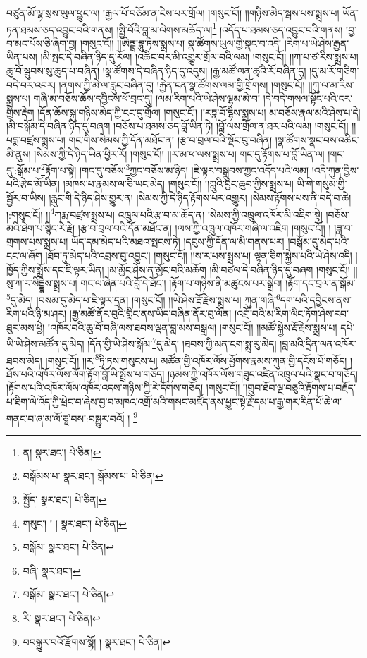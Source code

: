 བཙུན་མོ་ལྷ་སྲས་ཡུལ་ཕྱུང་ལ། །རྒྱལ་པོ་བཅོམ་ན་ངེས་པར་གྲོལ། །གསུང་ངོ།། །།གཉིས་མེད་སྦས་པས་སྨྲས་པ། ཡོན་ཏན་ཐམས་ཅད་འབྱུང་བའི་གནས། །སྤྱི་བོའི་བླ་མ་ལེགས་མཆོད་ལ།\footnote{ན།  སྣར་ཐང་།  པེ་ཅིན། } །འདོད་པ་ཐམས་ཅད་འབྱུང་བའི་གནས། །བྱ་བ་མང་པོས་ཅི་ཞིག་བྱ། །གསུང་ངོ།། །།ཨིནྡྲ་བྷཱུ་ཏིས་སྨྲས་པ། སྣ་ཚོགས་ཡུལ་གྱི་སྣང་བ་འདི། །རིག་པ་ཡེ་ཤེས་རྒྱན་ཡིན་པས། །མི་སྤང་དེ་བཞིན་ཉིད་དུ་རོལ། །འཆིང་བར་མི་འགྱུར་གྲོལ་བའི་ལམ། །གསུང་ངོ།། །།ཀ་པ་ཙ་རིས་སྨྲས་པ། ཆུ་བོ་སྦུབས་སུ་ཆུད་པ་བཞིན། །སྣ་ཚོགས་དེ་བཞིན་ཉིད་དུ་འདུས། །རྒྱ་མཚོ་ལན་ཚྭའི་རོ་བཞིན་དུ། །དུ་མ་རོ་གཅིག་བདེ་བར་འབར། །ནགས་ཀྱི་མེ་ལ་རླུང་བཞིན་དུ། །རྐྱེན་ངན་སྣ་ཚོགས་ལམ་གྱི་གྲོགས། །གསུང་ངོ།། །།ཀུ་ལ་མ་རིས་སྨྲས་པ། གཞི་མ་བཅོས་ཆོས་དབྱིངས་ཕོ་བྲང་དུ། །ལམ་རིག་པའི་ཡེ་ཤེས་ལྷམ་མེ་བ། །དེ་བདེ་གསལ་སྟོང་པའི་ངར་གྱིས་རྡེག །དོན་ཆོས་སྐུ་གཉིས་མེད་ཀྱི་ངང་དུ་གྲོལ། །གསུང་ངོ།། །།རཏྣ་བོ་དྷིས་སྨྲས་པ། མ་བཅོས་རྣལ་མའི་ཤེས་པ་དེ། །མི་བསྒོམ་དེ་བཞིན་ཉིད་དུ་བཞག །བཅོས་པ་ཐམས་ཅད་བློ་ཡིན་ཏེ། །བློ་ལས་གྲོལ་ན་ཐར་པའི་ལམ། །གསུང་ངོ།། །།པདྨ་བཛྲས་སྨྲས་པ། གང་གིས་སེམས་ཀྱི་དོན་མཐོང་ན། །རྩ་བ་བྲལ་བའི་སྡོང་བུ་བཞིན། །སྣ་ཚོགས་སྣང་བས་འཆིང་མི་ནུས། །སེམས་ཀྱི་དེ་ཉིད་ཡིན་ཕྱིར་རོ། །གསུང་ངོ།། །།ར་མ་ཕ་ལས་སྨྲས་པ། གང་དུ་རྟོགས་པ་བློ་ཡིན་ལ། །གང་དུ་:སྒོམ་པ་\footnote{བསྒོམས་པ་  སྣར་ཐང་། སྒོམས་པ་  པེ་ཅིན། }རྟོག་པ་སྟེ། །གང་དུ་བཅོས་\footnote{སྤྱོད་  སྣར་ཐང་།  པེ་ཅིན། }ཀྱང་བཅོས་མ་ཉིད། །ཇི་ལྟར་བསྒྲུབས་ཀྱང་འདོད་པའི་ལམ། །འདི་ཀུན་བྱིས་པའི་རྩེད་མོ་ཡིན། །མཁས་པ་རྣམས་ལ་ཅི་ཡང་མེད། །གསུང་ངོ།། །།ཀླུའི་བྱང་ཆུབ་ཀྱིས་སྨྲས་པ། ཡི་གེ་གསུམ་གྱི་སྦྱོར་བ་ཡིས། །རླུང་གི་དེ་ཉིད་ཤེས་གྱུར་ན། །སེམས་ཀྱི་དེ་ཉིད་རྟོགས་པར་འགྱུར། །སེམས་རྟོགས་པས་ནི་བདེ་བ་ཆེ། །:གསུང་ངོ།། །།\footnote{གསུང་། ། །  སྣར་ཐང་།  པེ་ཅིན། }ཀརྨ་བཛྲས་སྨྲས་པ། འཁྲུལ་པའི་རྩ་བ་མ་ཆོད་ན། །སེམས་ཀྱི་འཁྲུལ་འཁོར་མི་འཇིག་སྟེ། །བཅོས་མའི་ཐེག་པ་སྙིང་རེ་རྗེ། །རྩ་བ་བྲལ་བའི་དོན་མཐོང་ན། །ལས་ཀྱི་འཁྲུལ་འཁོར་གཞི་ལ་འཇིག །གསུང་ངོ།། །
།ཟླ་བ་གྲགས་པས་སྨྲས་པ། ཡོད་དམ་མེད་པའི་མཐའ་སྤངས་ཏེ། །དབུས་ཀྱི་དོན་ལ་མི་གནས་པར། །བསྒོམ་དུ་མེད་པའི་ངང་ལ་ཞོག །ཐོབ་ཏུ་མེད་པའི་འབྲས་བུ་འབྱུང་། །གསུང་ངོ།། །།ས་ར་པས་སྨྲས་པ། ལྷན་ཅིག་སྐྱེས་པའི་ཡེ་ཤེས་འདི། །ཁྱོད་ཀྱིས་སྨྲོས་དང་ཇི་ལྟར་ཡིན། །མ་མྱོང་ཤེས་ན་མྱོང་བའི་མཆོག །མི་བཙལ་དེ་བཞིན་ཉིད་དུ་བཞག །གསུང་ངོ།། །།སུ་ཀ་ར་སིདྡྷིས་སྨྲས་པ། གང་ལ་ཞེན་པའི་བློ་དེ་ཐོང་། །རྟོག་པ་གཉིས་ནི་མཚུངས་པར་སྒྲིབ། །རྟོག་དང་བྲལ་ན་སྒོམ་\footnote{བསྒོམ་  སྣར་ཐང་།  པེ་ཅིན། }དུ་མེད། །བསམ་དུ་མེད་པ་ཇི་ལྟར་དྲན། །གསུང་ངོ།། །།ཡེ་ཤེས་རྡོ་རྗེས་སྨྲས་པ། ཀུན་གཞི་\footnote{བཞི་  སྣར་ཐང་། }དག་པའི་དབྱིངས་ནས་རིག་པའི་ཉི་མ་ཤར། །རྒྱ་མཚོ་ནོར་བུའི་གླིང་ནས་ཡིད་བཞིན་ནོར་བུ་ལོན། །འགྲོ་བའི་མ་རིག་ལིང་ཏོག་ཤེས་རབ་ཐུར་མས་ཕྱེ། །འཁོར་བའི་ཆུ་བོ་བཞི་ལས་ཐབས་ལྡན་བླ་མས་བསྒྲལ། །གསུང་ངོ།། །།མཚོ་སྐྱེས་རྡོ་རྗེས་སྨྲས་པ། དཔེ་ཡི་ཡེ་ཤེས་མཚོན་དུ་མེད། །དོན་གྱི་ཡེ་ཤེས་སྒོམ་\footnote{བསྒོམ་  སྣར་ཐང་།  པེ་ཅིན། }དུ་མེད། །ཐབས་ཀྱི་མན་ངག་སྨྲ་རུ་མེད། །བླ་མའི་དྲིན་ལན་འཁོར་ཐབས་མེད། །གསུང་ངོ།། །།ར་\footnote{རི་  སྣར་ཐང་།  པེ་ཅིན། }ཏྲི་ཏས་གསུངས་པ། མཚོན་གྱི་འཁོར་ལོས་ཕྱོགས་རྣམས་ཀུན་གྱི་དངོས་པོ་གཅོད། །ཐོས་པའི་འཁོར་ལོས་ལོག་རྟོག་བློ་ཡི་སྤྲོས་པ་གཅོད། །ཉམས་ཀྱི་འཁོར་ལོས་གཟུང་འཛིན་འཁྲུལ་པའི་སྣང་བ་གཅོད། །རྟོགས་པའི་འཁོར་ལོས་འཁོར་འདས་གཉིས་ཀྱི་རེ་དོགས་གཅོད། །གསུང་ངོ།། །།གྲུབ་ཐོབ་ལྔ་བཅུའི་རྟོགས་པ་བརྗོད་པ་ཐིག་ལེ་འོད་ཀྱི་ཕྲེང་བ་ཞེས་བྱ་བ་མཁའ་འགྲོ་མའི་གསང་མཛོད་ནས་ཕྱུང་སྟེ་རྗེ་དམ་པ་རྒྱ་གར་རིན་པོ་ཆེ་ལ་གནང་བ་ཞ་མ་ལོ་ཙཱ་བས་:བསྒྱུར་བའོ། ། \footnote{བབསྒྱུར་བའོ་རྫོགས་སྷོ། །   སྣར་ཐང་།  པེ་ཅིན། }